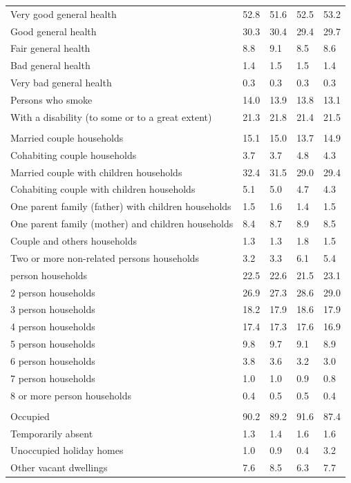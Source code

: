 \documentclass{article}
\begin{document}
\begin{table}[h]
\begin{tabular}{KTTTT}
    \hline
Very good general health & 52.8& 51.6&52.5& 53.2\\
Good general health & 30.3& 30.4& 29.4& 29.7\\
Fair general health & 8.8& 9.1&8.5& 8.6\\
Bad general health & 1.4& 1.5&1.5& 1.4\\
Very bad general health & 0.3& 0.3&0.3& 0.3\\
    \hline
Persons who smoke & 14.0& 13.9&13.8& 13.1\\
    \hline
With a disability (to some or to a great extent) & 21.3& 21.8&21.4& 21.5\\
\hline
    \\ 
    \hline
Married couple households & 15.1& 15.0& 13.7& 14.9\\
Cohabiting couple households & 3.7& 3.7& 4.8& 4.3\\
Married couple with children households & 32.4& 31.5& 29.0& 29.4\\
Cohabiting couple with children households & 5.1& 5.0& 4.7& 4.3\\
One parent family (father) with  children households & 1.5& 1.6& 1.4& 1.5\\
One parent family (mother) and children households & 8.4& 8.7& 8.9& 8.5\\
Couple and others households  & 1.3& 1.3& 1.8& 1.5\\
Two or more non-related persons households & 3.2& 3.3& 6.1& 5.4\\
     person households & 22.5& 22.6& 21.5& 23.1\\
2 person households & 26.9& 27.3& 28.6& 29.0\\
3 person households & 18.2& 17.9& 18.6& 17.9\\
4 person households & 17.4& 17.3& 17.6& 16.9\\
5 person households & 9.8& 9.7& 9.1& 8.9\\
6 person households & 3.8& 3.6& 3.2& 3.0\\
7 person households & 1.0& 1.0& 0.9& 0.8\\
8 or more person households & 0.4& 0.5& 0.5& 0.4\\
\hline
    \\ 
    \hline
Occupied & 90.2& 89.2& 91.6& 87.4\\
Temporarily absent & 1.3& 1.4& 1.6& 1.6\\
Unoccupied holiday homes & 1.0& 0.9& 0.4& 3.2\\
Other vacant dwellings & 7.6& 8.5& 6.3& 7.7\\
\hline
\end{tabular}
\end{table}
\end{document}
